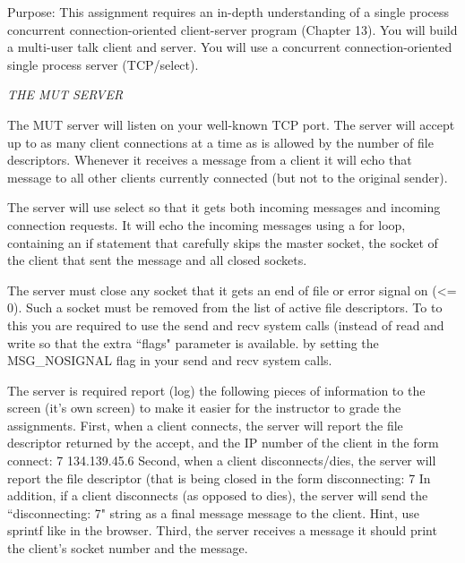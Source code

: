 

\parindent 0pt

Purpose: This assignment requires an in-depth understanding of
a single process concurrent connection-oriented client-server program 
(Chapter 13).
You will build a multi-user talk client and server.
You will use a concurrent connection-oriented single process server 
(TCP/select).

{\it THE MUT SERVER}

The MUT server will listen on your well-known TCP port.
The server will accept up to as many client connections at a time as is
allowed by the number of file descriptors.
Whenever it receives a message from a client it will echo that message
to all other clients currently connected (but not to the original sender).

The server will use select so that it gets both incoming
messages and incoming connection requests.
It will echo the incoming messages using a for loop, containing
an if statement that carefully skips the master socket, the socket of the
client that sent the message and all closed sockets.

The server must close any socket that it gets
an end of file or error signal on ({\ltt{}<= 0}).
Such a socket must be removed from the list of active file descriptors.
To to this you are required
to use the {\ltt{}send} and {\ltt{}recv}
system calls (instead of {\ltt{}read} and {\ltt{}write} so that
the extra ``flags" parameter is available.
by setting the {\ltt{}MSG_NOSIGNAL} flag
in your {\ltt{}send} and {\ltt{}recv} system calls.

The server is required  report (log) the following pieces of information to
the screen (it's own screen) to make it easier for the
instructor to grade the assignments.
First, when a client connects, 
the server will report the file descriptor
returned by the accept, and the IP number of the client
in the form\hfill\break
{\ltt{}connect: 7 134.139.45.6}
\hfill\break
Second, when a client disconnects/dies, the server will report the file
descriptor (that is being closed
in the form\hfill\break
{\ltt{}disconnecting: 7}
\hfill\break
In addition, if a client disconnects (as opposed to dies), the
server will send the ``disconnecting: 7" string as a final message message
to the client. Hint, use {\ltt{}sprintf} like in the browser.
\hfill\break
Third, the server receives a message it should print the client's
socket number and the message.

